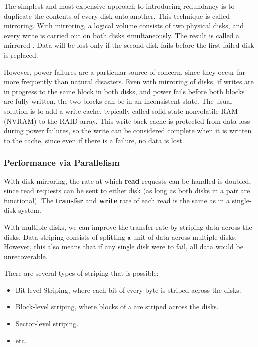 The simplest and most expensive approach to introducing redundancy is to duplicate the contents of every disk onto another.
This technique is called mirroring.
With mirroring, a logical volume consists of two physical disks, and every write is carried out on both disks simultaneously.
The result is called a mirrored .
Data will be lost only if the second disk fails before the first failed disk is replaced.

However, power failures are a particular source of concern, since they occur far more frequently than natural disasters.
Even with mirroring of disks, if writes are in progress to the same block in both disks, and power fails before both blocks are fully written, the two blocks can be in an inconsistent state.
The usual solution is to add a write-cache, typically called solid-state nonvolatile RAM (NVRAM) to the RAID array.
This write-back cache is protected from data loss during power failures, so the write can be considered complete when it is written to the cache, since even if there is a failure, no data is lost.

\subsubsection{Performance via Parallelism}\label{subsubsec:RAID_Performance_Parallelism}
With disk mirroring, the rate at which \textbf{read} requests can be handled is doubled, since read requests can be sent to either disk (as long as both disks in a pair are functional).
The \textbf{transfer} and \textbf{write} rate of each read is the same as in a single-disk system.

With multiple disks, we can improve the transfer rate by striping data across the disks.
Data striping consists of splitting a unit of data across multiple disks.
However, this also means that if any single disk were to fail, all data would be unrecoverable.

There are several types of striping that is possible:
\begin{itemize}[noitemsep]
\item Bit-level Striping, where each bit of every byte is striped across the disks.
\item Block-level striping, where blocks of a  are striped across the disks.
\item Sector-level striping.
\item etc.
\end{itemize}

